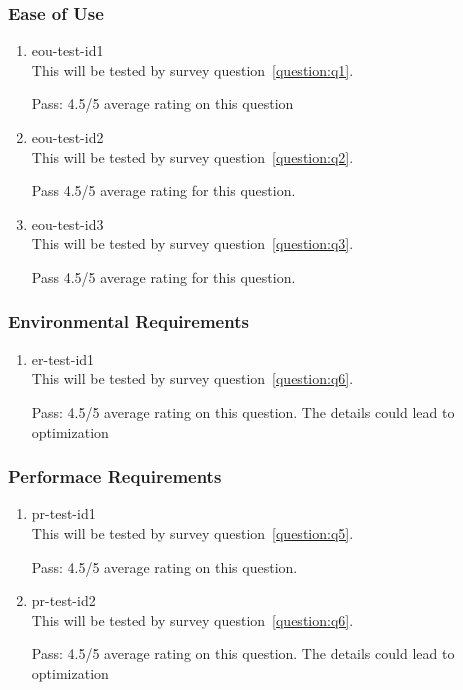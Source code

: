 \documentclass[12pt, titlepage]{article}
\begin{document}
\subsubsection{Ease of Use}

\begin{enumerate}

\item{eou-test-id1\\}
This will be tested by survey question~\ref{question:q1}.

Pass: 4.5/5 average rating on this question
\item{eou-test-id2\\}
This will be tested by survey question~\ref{question:q2}.

Pass 4.5/5 average rating for this question.
\item{eou-test-id3\\}
This will be tested by survey question~\ref{question:q3}.

Pass 4.5/5 average rating for this question.
\end{enumerate}

\subsubsection{Environmental Requirements}

\begin{enumerate}

\item{er-test-id1\\}
This will be tested by survey question~\ref{question:q6}.

Pass: 4.5/5 average rating on this question. The details could lead to optimization
\end{enumerate}

\subsubsection{Performace Requirements}

\begin{enumerate}

\item{pr-test-id1\\}
This will be tested by survey question~\ref{question:q5}.

Pass: 4.5/5 average rating on this question.
\item{pr-test-id2\\}
This will be tested by survey question~\ref{question:q6}.

Pass: 4.5/5 average rating on this question. The details could lead to optimization
\end{enumerate}
\end{document}
